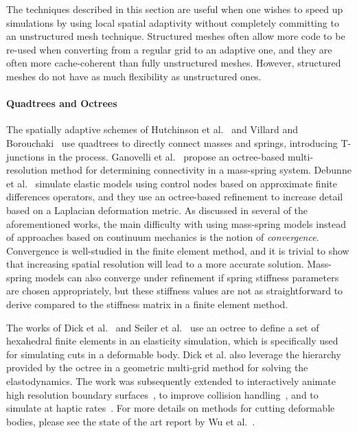 The techniques described in this section are useful when one wishes to speed up simulations by using local spatial adaptivity without completely committing to an unstructured mesh technique. Structured meshes often allow more code to be re-used when converting from a regular grid to an adaptive one, and they are often more cache-coherent than fully unstructured meshes. However, structured meshes do not have as much flexibility as unstructured ones.

\paragraph*{Quadtrees and Octrees}
The spatially adaptive schemes of Hutchinson et al.~\cite{Hutchinson1996} and Villard and Borouchaki~\cite{Villard2005} use quadtrees to directly connect masses and springs, introducing T-junctions in the process. Ganovelli et al.~\cite{Ganovelli1999} propose an octree-based multi-resolution method for determining connectivity in a mass-spring system. Debunne et al.~\cite{Debunne1999} simulate elastic models using control nodes based on approximate finite differences operators, and they use an octree-based refinement to increase detail based on a Laplacian deformation metric. As discussed in several of the aforementioned works, the main difficulty with using mass-spring models instead of approaches based on continuum mechanics is the notion of {\em convergence}. Convergence is well-studied in the finite element method, and it is trivial to show that increasing spatial resolution will lead to a more accurate solution. Mass-spring models can also converge under refinement if spring stiffness parameters are chosen appropriately, but these stiffness values are not as straightforward to derive compared to the stiffness matrix in a finite element method.

The works of Dick et al.~\cite{Dick2011} and Seiler et al.~\cite{Seiler2011} use an octree to define a set of hexahedral finite elements in an elasticity simulation, which is specifically used for simulating cuts in a deformable body. Dick et al. also leverage the hierarchy provided by the octree in a geometric multi-grid method for solving the elastodynamics.
The work was subsequently extended to interactively animate high resolution boundary surfaces~\cite{Wu2011}, to improve collision handling~\cite{Wu2013}, and to simulate at haptic rates~\cite{Wu2014}. For more details on methods for cutting deformable bodies, please see the state of the art report by Wu et al.~\cite{Wu2015}.

